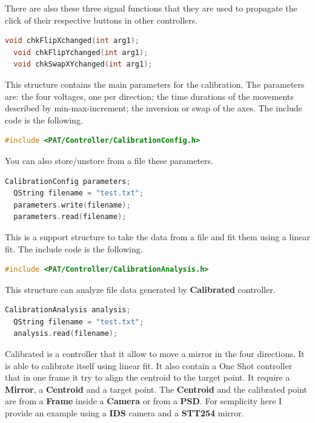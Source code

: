 There are also these three signal functions that they are used to
propagate the click of their respective buttons in other controllers.

\begin{lstlisting}[language=c++, gobble=2]
  void chkFlipXchanged(int arg1);
  void chkFlipYchanged(int arg1);
  void chkSwapXYchanged(int arg1);
\end{lstlisting}



This structure contains the main parameters for the calibration. The
parameters are: the four voltages, one per direction; the time durations
of the movements described by min-max-increment; the inversion or swap
of the axes. The include code is the following.

\begin{lstlisting}[language=c++, gobble=2]
  #include <PAT/Controller/CalibrationConfig.h>
\end{lstlisting}


You can also store/unstore from a file these parameters.

\begin{lstlisting}[language=c++, gobble=2]
  CalibrationConfig parameters;
  QString filename = "test.txt";
  parameters.write(filename);
  parameters.read(filename);
\end{lstlisting}



This is a support structure to take the data from a file and fit them
using a linear fit. The include code is the following.

\begin{lstlisting}[language=c++, gobble=2]
  #include <PAT/Controller/CalibrationAnalysis.h>
\end{lstlisting}

This structure can analyze file data generated by \textbf{Calibrated}
controller.

\begin{lstlisting}[language=c++, gobble=2]
  CalibrationAnalysis analysis;
  QString filename = "test.txt";
  analysis.read(filename);
\end{lstlisting}


Calibrated is a controller that it allow to move a mirror in the four
directions. It is able to calibrate itself using linear fit. It also
contain a One Shot controller that in one frame it try to align the
centroid to the target point. It require a \textbf{Mirror}, a
\textbf{Centroid} and a target point. The \textbf{Centroid} and the
calibrated point are from a \textbf{Frame} inside a \textbf{Camera} or
from a \textbf{PSD}. For semplicity here I provide an example using a
\textbf{IDS} camera and a \textbf{STT254} mirror.

